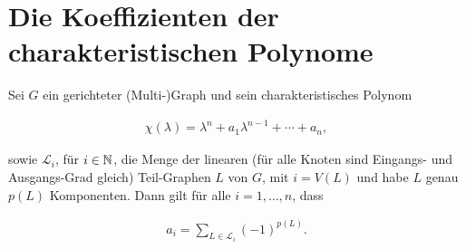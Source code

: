 \chapter{Die Koeffizienten der charakteristischen Polynome}

    \begin{theorem}[Sachs]

        Sei $G$ ein gerichteter (Multi-)Graph und sein charakteristisches Polynom

        \begin{align*}
            \chi(\lambda)
            =
            \lambda^n + a_1 \lambda^{n-1} + \cdots + a_n,
        \end{align*}

        sowie $\mathcal L_i$, für $i \in \mathbb N$, die Menge der linearen (für alle Knoten sind Eingangs- und Ausgangs-Grad gleich) Teil-Graphen $L$ von $G$, mit $i = V(L)$ und habe $L$ genau $p(L)$ Komponenten.
        Dann gilt für alle $i = 1, \dots, n$, dass

        \begin{align*}
            a_i = \sum_{L \in \mathcal L_i} (-1)^{p(L)}.
        \end{align*}

    \end{theorem}
